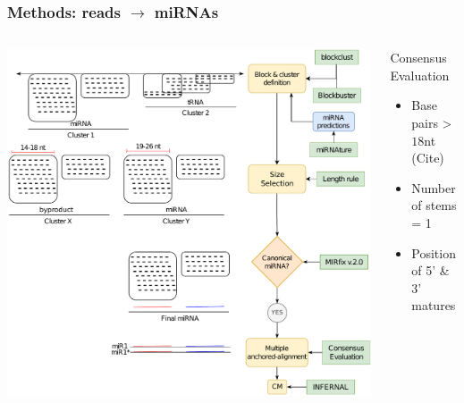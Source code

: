 \begin{frame}[t]
    \frametitle{Methods: reads $\rightarrow$ miRNAs}
    \begin{columns}
        \begin{column}{0.6\textwidth}
            \includegraphics[width=\linewidth]{Figures/workflow3}\label{fig:workflow} %
        \end{column}
        \begin{column}{0.4\textwidth}
            Consensus Evaluation
            \begin{itemize}
                \item Base pairs > $18$nt (Cite)
                \item Number of stems = 1
                \item Position of 5' \& 3' matures
            \end{itemize}
        \end{column}
    \end{columns}
\end{frame}
